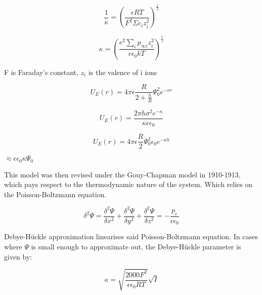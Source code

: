 \begin{equation} 
\frac{1}{\kappa} = \left(\frac{\epsilon RT}{F^2 \Sigma c_i z_i^2}\right)^\frac{1}{2}
\end{equation}

\begin{equation} 
\kappa = \left(\frac{e^2 \sum_{i} p_{\infty i} z_i^2} {\epsilon \epsilon_0 k T}  \right)^\frac{1}{2} 
\end{equation}\textbf{}

 F is Faraday's constant, $z_i$ is the valence of i ions
 
\begin{equation} %
U_E (r) = 4\pi\epsilon \frac{R}{2 + \frac{h}{R}}\Psi^2_{0} e^{-\kappa r}
\end{equation}

\begin{equation} 
U_E (r) = \frac{2\pi h \sigma^2 e^{-\kappa}}{\kappa \epsilon \epsilon_0}
\end{equation}

\begin{equation} %
U_E (r) = 4\pi\epsilon \frac{R}{2}\Psi^2_{0} \epsilon_0 e^{-\kappa h}
\end{equation}

 $\approx \epsilon \epsilon_0 \kappa \Psi_0$
 

This model was then revised under the Gouy-Chapman model in 1910-1913, \cite{34} which pays respect to the thermodynamic nature of the system. Which relies on the Poisson-Boltzmann equation.

\begin{equation} %
\delta ^2 \Psi = \frac{\delta^2 \Psi}{\delta x^2} + \frac{\delta^2 \Psi}{\delta y^2} + \frac{\delta^2 \Psi}{\delta z^2} = - \frac{p_e}{\epsilon \epsilon_0}
\end{equation}

Debye-H\"uckle approximation linearises said Poisson-Boltzmann equation. In cases where $\Psi$ is small enough to approximate out, the Debye-H\"uckle parameter is given by: %

\begin{equation} 
\kappa =  \sqrt{\frac{2000 F^2}{\epsilon \epsilon_0 R T}} \sqrt{I}
\end{equation}

